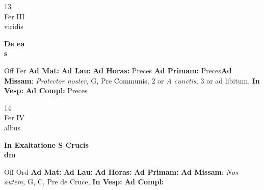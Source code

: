 \documentclass[10pt, openany]{book}
\begin{document}
    \begin{center}
        \begin{minipage}{3.5in}
            \vspace{2em}
            \begin{minipage}{0.5in}
                {\Huge 13} \\
                {\normalsize Fer III} \\
                {\normalsize viridis}
            \end{minipage}
            \begin{minipage}{3.0in}
                \textbf{ \large De ea \\
                \textnormal{\normalsize s}} \\ 
            \end{minipage}
            \begin{justify}Off Fer
                \textbf{Ad Mat: }
                \textbf{Ad Lau: }
                \textbf{Ad Horas: }Preces
                \textbf{Ad Primam: }Preces\textbf{Ad Missam}: \textit{Protector noster,} G, Pre Communis, 2 or \textit{A cunctis,} 3 or ad libitum,  
                \textbf{In Vesp: }
                \textbf{Ad Compl: }Preces
            \end{justify}
        \end{minipage}
    \end{center}

    \begin{center}
        \begin{minipage}{3.5in}
            \vspace{2em}
            \begin{minipage}{0.5in}
                {\Huge 14} \\
                {\normalsize Fer IV} \\
                {\normalsize albus}
            \end{minipage}
            \begin{minipage}{3.0in}
                \textbf{ \large In Exaltatione S Crucis \\
                \textnormal{\normalsize dm}} \\ 
            \end{minipage}
            \begin{justify}Off Ord
                \textbf{Ad Mat: }
                \textbf{Ad Lau: }
                \textbf{Ad Horas: }
                \textbf{Ad Primam: }\textbf{Ad Missam}: \textit{Nos autem,} G, C, Pre de Cruce,  
                \textbf{In Vesp: }
                \textbf{Ad Compl: }
            \end{justify}
        \end{minipage}
    \end{center}
\end{document}
